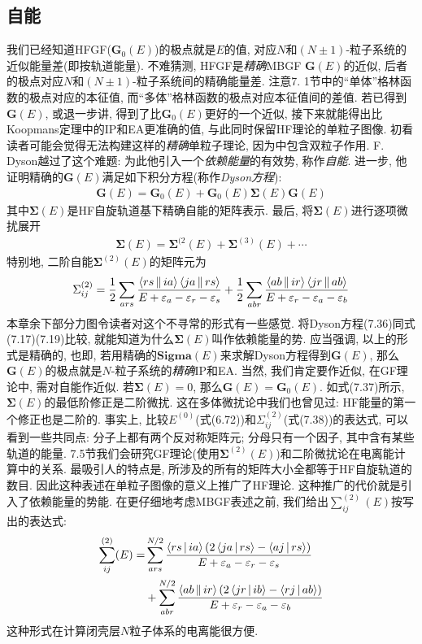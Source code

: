 \subsection{自能}
我们已经知道HFGF($\mathbf{G}_0(E)$)的极点就是$E$的值, 
对应$N$和$(N\pm1)$-粒子系统的近似能量差(即按轨道能量). 
不难猜测, 
HFGF是\emph{精确}MBGF $\mathbf{G}(E)$的近似, 
后者的极点对应$N$和$(N\pm1)$-粒子系统间的精确能量差. 
注意7.
1节中的“单体”格林函数的极点对应\ha 的本征值, 
而“多体”格林函数的极点对应本征值间的差值. 
若已得到$\mathbf{G}(E)$, 
或退一步讲, 
得到了比$\mathbf{G}_0(E)$更好的一个近似, 
接下来就能得出比Koopmans定理中的IP和EA更准确的值, 
与此同时保留HF理论的单粒子图像. 
初看读者可能会觉得无法构建这样的\emph{精确}单粒子理论, 
因为\ha 中包含双粒子作用. 
F. Dyson越过了这个难题: 为此他引入一个\emph{依赖能量}的有效势, 
称作\emph{自能}. 
进一步, 
他证明精确的$\mathbf{G}(E)$满足如下积分方程(称作\emph{Dyson方程}):
\begin{align}
\mathbf{G}(E) = \mathbf{G}_0(E) + \mathbf{G}_0(E)\mathbf{\Sigma}(E)\mathbf{G}(E) 
\end{align}
其中$\mathbf{\Sigma}(E)$是HF自旋轨道基下精确自能的矩阵表示. 
最后, 
将$\mathbf{\Sigma}(E)$进行逐项微扰展开
\begin{align}
\mathbf{\Sigma}(E) = \mathbf{\Sigma}^{(2}(E) + \mathbf{\Sigma}^{(3)}(E) + \cdots
\end{align}
特别地, 
二阶自能$\mathbf{\Sigma}^{(2)}(E)$的矩阵元为
\begin{align}\label{7.38}
\Sigma_{ij}^{(2)} = \frac{1}{2}\sum_{ars}\frac{\Braket{rs||ia}\Braket{ja||rs}}{E+\varepsilon_a-\varepsilon_r-\varepsilon_s} + 
\frac{1}{2}\sum_{abr}\frac{\Braket{ab||ir}\Braket{jr||ab}}{E+\varepsilon_r-\varepsilon_a-\varepsilon_b}
\end{align}
本章余下部分力图令读者对这个不寻常的形式有一些感觉. 
将Dyson方程(7.36)同式(7.17)(7.19)比较, 
就能知道为什么$\mathbf{\Sigma}(E)$叫作依赖能量的势. 
应当强调, 
以上的形式是精确的, 
也即, 
若用精确的$\mathbf{Sigma}(E)$来求解Dyson方程得到$\mathbf{G}(E)$, 
那么$\mathbf{G}(E)$的极点就是$N$-粒子系统的\emph{精确}IP和EA. 
当然, 
我们肯定要作近似, 
在GF理论中, 
需对自能作近似. 
若$\mathbf{\Sigma}(E)=0$, 
那么$\mathbf{G}(E)=\mathbf{G}_0(E)$. 
如式(7.37)所示, 
$\mathbf{\Sigma}(E)$的最低阶修正是二阶微扰. 
这在多体微扰论中我们也曾见过: HF能量的第一个修正也是二阶的. 
事实上, 
比较$E^{(0)}$(式(6.72))和$\Sigma_{ij}^{(2)}$(式(7.38))的表达式, 
可以看到一些共同点: 分子上都有两个反对称矩阵元; 
分母只有一个因子, 
其中含有某些轨道的能量. 
7.5节我们会研究GF理论(使用$\mathbf{\Sigma}^{(2)}(E)$)和二阶微扰论在电离能计算中的关系. 
最吸引人的特点是, 
所涉及的所有的矩阵大小全都等于HF自旋轨道的数目. 
因此这种表述在单粒子图像的意义上推广了HF理论. 
这种推广的代价就是引入了依赖能量的势能. 
在更仔细地考虑MBGF表述之前, 
我们给出$\sum_{ij}^{(2)}(E)$按写出的表达式:
\begin{align}
\sum_{ij}^{(2)}(E) = & \sum_{ars}^{N/2} \frac{\Braket{rs|ia}(2\Braket{ja|rs}-\Braket{aj|rs})}{E+\varepsilon_a-\varepsilon_r-\varepsilon_s}\notag\\
                     & + \sum_{abr}^{N/2}\frac{\Braket{ab||ir}(2\Braket{jr|ib}-\Braket{rj|ab})}{E+\varepsilon_r-\varepsilon_a-\varepsilon_b}
		     \label{7.39}
\end{align}
这种形式在计算闭壳层$N$粒子体系的电离能很方便.

